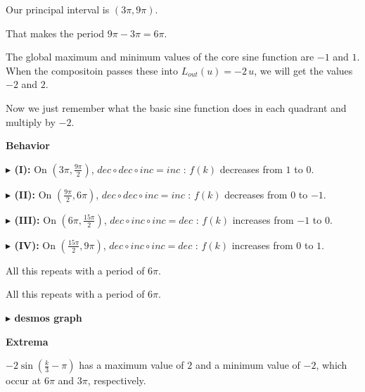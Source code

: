 \documentclass{ximera}
\begin{document}
\begin{example}
Our principal interval is $\left( 3 \pi, 9 \pi \right)$.

That makes the period $9 \pi - 3 \pi = 6 \pi$.


The global maximum and minimum values of the core sine function are $-1$ and $1$. When the compositoin passes these into $L_{out}(u) = -2 \, u$, we will get the values $-2$ and $2$.


Now we just remember what the basic sine function does in each quadrant and multiply by $-2$. 



\textbf{\textcolor{blue!55!black}{Behavior}} 



\textbf{\textcolor{blue!55!black}{$\blacktriangleright$ (I):}} On $\left( 3 \pi, \frac{9\pi}{2} \right)$, $dec \circ dec \circ inc = inc$ : $f(k)$ decreases from $1$ to $0$.



\textbf{\textcolor{blue!55!black}{$\blacktriangleright$ (II):}} On $\left( \frac{9\pi}{2}, 6 \pi \right)$, $dec \circ dec \circ inc = inc$ : $f(k)$ decreases from $0$ to $-1$.



\textbf{\textcolor{blue!55!black}{$\blacktriangleright$ (III):}} On $\left( 6 \pi, \frac{15\pi}{2} \right)$, $dec \circ inc \circ inc = dec$ : $f(k)$ increases from $-1$ to $0$.


\textbf{\textcolor{blue!55!black}{$\blacktriangleright$ (IV):}} On $\left( \frac{15\pi}{2}, 9 \pi \right)$, $dec \circ inc \circ inc = dec$ : $f(k)$ increases from $0$ to $1$.



All this repeats with a period of $6 \pi$.






All this repeats with a period of $6 \pi$.









\textbf{\textcolor{blue!55!black}{$\blacktriangleright$ desmos graph}} 
\begin{center}
\end{center}






\textbf{\textcolor{blue!55!black}{Extrema}} 




$-2 \sin\left( \frac{k}{3} - \pi \right)$ has a maximum value of $2$ and a minimum value of $-2$, which occur at $6 \pi$ and $3 \pi$, respectively.






\end{example}
\end{document}
